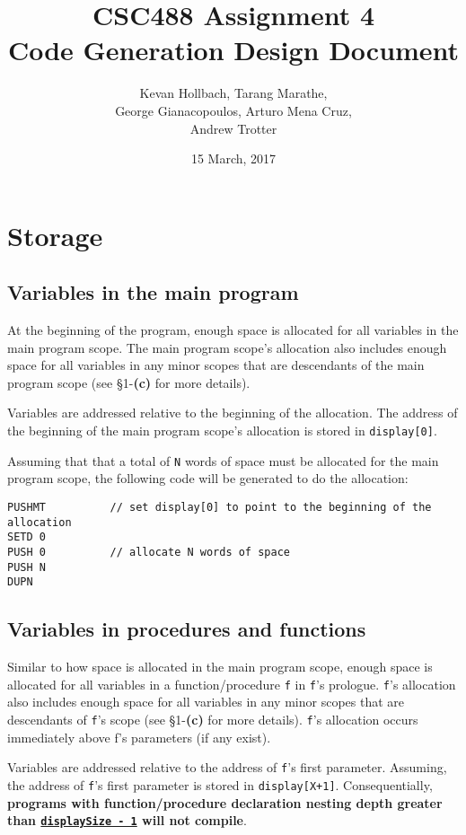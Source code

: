 \documentclass[11pt]{article}
\title{CSC488 Assignment 4 \\ Code Generation Design Document}
\author{Kevan Hollbach, Tarang Marathe, \\ George Gianacopoulos, Arturo Mena Cruz, \\ Andrew Trotter}
\date{15 March, 2017}
\begin{document}
\maketitle

\section{Storage}

\subsection{Variables in the main program}

At the beginning of the program, enough space is allocated for all variables in the main program scope. The main program scope's allocation also includes enough space for all variables in any minor scopes that are descendants of the main program scope (see \S 1-\textbf{(c)} for more details).

Variables are addressed relative to the beginning of the allocation. The address of the beginning of the main program scope's allocation is stored in \texttt{display[0]}.

Assuming that that a total of \texttt{N} words of space must be allocated for the main program scope, the following code will be generated to do the allocation:

\begin{verbatim}
PUSHMT          // set display[0] to point to the beginning of the allocation
SETD 0
PUSH 0          // allocate N words of space
PUSH N
DUPN
\end{verbatim}

\subsection{Variables in procedures and functions}

Similar to how space is allocated in the main program scope, enough space is allocated for all variables in a function/procedure \texttt{f} in \texttt{f}'s prologue. \texttt{f}'s allocation also includes enough space for all variables in any minor scopes that are descendants of \texttt{f}'s scope (see \S 1-\textbf{(c)} for more details). \texttt{f}'s allocation occurs immediately above f's parameters (if any exist).

Variables are addressed relative to the address of \texttt{f}'s first parameter. Assuming, the address of \texttt{f}'s first parameter is stored in \texttt{display[X+1]}. Consequentially, \textbf{programs with function/procedure declaration nesting depth greater than \underline{\texttt{displaySize - 1}} will not compile}.
\end{document}
